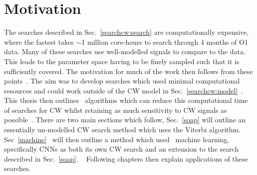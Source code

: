 \section{\label{searchcw:motivation}Motivation}


The searches described in Sec.~\ref{searchcw:search} are computationally
expensive, where the fastest takes $\sim$1 million core-hours to search through
4 months of O1 data.  Many of these searches use well-modelled signals to
compare to the data. This leads to the parameter space having to be finely
sampled such that it is sufficiently covered.  The motivation for much of the
work then follows from these points~. The aim was
to develop searches which used minimal computational resources and could work
outside of the \gls{CW} model in Sec.~\ref{searchcw:model}~.  This thesis then
outlines~ algorithms which can reduce this computational
time of searches for \gls{CW} whilst retaining as much sensitivity to \gls{CW}
signals as possible~.  There are two main sections which follow,
Sec.~\ref{soap} will outline an essentially un-modelled \gls{CW} search method
which uses the Viterbi algorithm.  Sec~\ref{machine}~ will then outline a method which used~ machine
learning, specifically \glspl{CNN} as both its own \gls{CW} search and an
extension to the search described in Sec.~\ref{soap}.  ~ Following
chapters then explain applications of these searches.~



